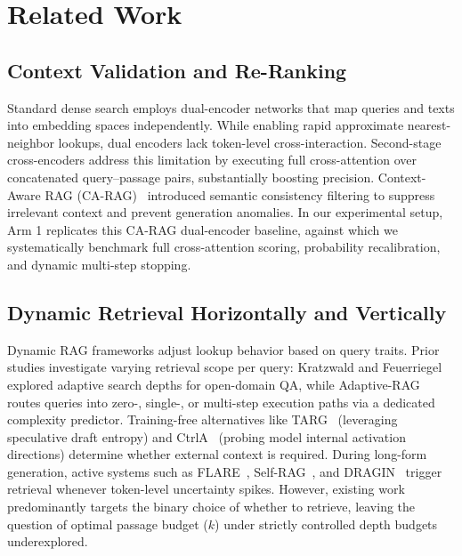 \documentclass[conference]{IEEEtran}
\begin{document}
\section{Related Work}
\label{sec:related}

\subsection{Context Validation and Re-Ranking}
Standard dense search employs dual-encoder networks that map queries and texts into embedding spaces independently. While enabling rapid approximate nearest-neighbor lookups, dual encoders lack token-level cross-interaction. Second-stage cross-encoders address this limitation by executing full cross-attention over concatenated query--passage pairs, substantially boosting precision. Context-Aware RAG (CA-RAG)~\cite{collini2025carag} introduced semantic consistency filtering to suppress irrelevant context and prevent generation anomalies. In our experimental setup, Arm 1 replicates this CA-RAG dual-encoder baseline, against which we systematically benchmark full cross-attention scoring, probability recalibration, and dynamic multi-step stopping.

\subsection{Dynamic Retrieval Horizontally and Vertically}
Dynamic RAG frameworks adjust lookup behavior based on query traits. Prior studies investigate varying retrieval scope per query: Kratzwald and Feuerriegel~\cite{kratzwald2018adaptive} explored adaptive search depths for open-domain QA, while Adaptive-RAG~\cite{jeong2024adaptiverag} routes queries into zero-, single-, or multi-step execution paths via a dedicated complexity predictor. Training-free alternatives like TARG~\cite{wang2024targ} (leveraging speculative draft entropy) and CtrlA~\cite{liu2024ctrla} (probing model internal activation directions) determine whether external context is required. During long-form generation, active systems such as FLARE~\cite{jiang2023flare}, Self-RAG~\cite{asai2024selfrag}, and DRAGIN~\cite{su2024dragin} trigger retrieval whenever token-level uncertainty spikes. However, existing work predominantly targets the binary choice of whether to retrieve, leaving the question of optimal passage budget ($k$) under strictly controlled depth budgets underexplored.
\end{document}
